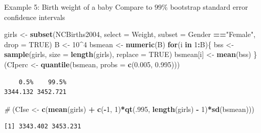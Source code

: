 \documentclass[
  ignorenonframetext,
]{beamer}
\newenvironment{Shaded}{\begin{snugshade}}{\end{snugshade}}
\newcommand{\AttributeTok}[1]{\textcolor[rgb]{0.13,0.29,0.53}{#1}}
\newcommand{\CommentTok}[1]{\textcolor[rgb]{0.56,0.35,0.01}{\textit{#1}}}
\newcommand{\ConstantTok}[1]{\textcolor[rgb]{0.56,0.35,0.01}{#1}}
\newcommand{\ControlFlowTok}[1]{\textcolor[rgb]{0.13,0.29,0.53}{\textbf{#1}}}
\newcommand{\DecValTok}[1]{\textcolor[rgb]{0.00,0.00,0.81}{#1}}
\newcommand{\FloatTok}[1]{\textcolor[rgb]{0.00,0.00,0.81}{#1}}
\newcommand{\FunctionTok}[1]{\textcolor[rgb]{0.13,0.29,0.53}{\textbf{#1}}}
\newcommand{\NormalTok}[1]{#1}
\newcommand{\OtherTok}[1]{\textcolor[rgb]{0.56,0.35,0.01}{#1}}
\newcommand{\SpecialCharTok}[1]{\textcolor[rgb]{0.81,0.36,0.00}{\textbf{#1}}}
\newcommand{\StringTok}[1]{\textcolor[rgb]{0.31,0.60,0.02}{#1}}
\begin{document}
\begin{frame}[fragile]{Example 5: Birth weight of a baby}
\protect\hypertarget{example-5-birth-weight-of-a-baby-6}{}
Compare to \(99\%\) bootstrap standard error confidence intervals \tiny

\begin{Shaded}
\begin{Highlighting}[]
\NormalTok{girls }\OtherTok{\textless{}{-}} \FunctionTok{subset}\NormalTok{(NCBirths2004, }\AttributeTok{select =}\NormalTok{ Weight, }\AttributeTok{subset =}\NormalTok{ Gender }\SpecialCharTok{==}\StringTok{"Female"}\NormalTok{, }\AttributeTok{drop =} \ConstantTok{TRUE}\NormalTok{)}
\NormalTok{B }\OtherTok{\textless{}{-}} \DecValTok{10}\SpecialCharTok{\^{}}\DecValTok{4}
\NormalTok{bsmean }\OtherTok{\textless{}{-}} \FunctionTok{numeric}\NormalTok{(B)}
\ControlFlowTok{for}\NormalTok{(i }\ControlFlowTok{in} \DecValTok{1}\SpecialCharTok{:}\NormalTok{B)\{}
\NormalTok{  bss }\OtherTok{\textless{}{-}} \FunctionTok{sample}\NormalTok{(girls, }\AttributeTok{size =} \FunctionTok{length}\NormalTok{(girls), }\AttributeTok{replace =} \ConstantTok{TRUE}\NormalTok{)}
\NormalTok{  bsmean[i] }\OtherTok{\textless{}{-}} \FunctionTok{mean}\NormalTok{(bss)}
\NormalTok{\}}
\NormalTok{(CIperc }\OtherTok{\textless{}{-}} \FunctionTok{quantile}\NormalTok{(bsmean, }\AttributeTok{probs =} \FunctionTok{c}\NormalTok{(}\FloatTok{0.005}\NormalTok{, }\FloatTok{0.995}\NormalTok{)))}
\end{Highlighting}
\end{Shaded}

\begin{verbatim}
    0.5%    99.5% 
3344.132 3452.721 
\end{verbatim}

\begin{Shaded}
\begin{Highlighting}[]
\CommentTok{\#}
\NormalTok{(CIse }\OtherTok{\textless{}{-}} \FunctionTok{c}\NormalTok{(}\FunctionTok{mean}\NormalTok{(girls) }\SpecialCharTok{+} \FunctionTok{c}\NormalTok{(}\SpecialCharTok{{-}}\DecValTok{1}\NormalTok{, }\DecValTok{1}\NormalTok{)}\SpecialCharTok{*}\FunctionTok{qt}\NormalTok{(.}\DecValTok{995}\NormalTok{, }\FunctionTok{length}\NormalTok{(girls) }\SpecialCharTok{{-}} \DecValTok{1}\NormalTok{)}\SpecialCharTok{*}\FunctionTok{sd}\NormalTok{(bsmean)))}
\end{Highlighting}
\end{Shaded}

\begin{verbatim}
[1] 3343.402 3453.231
\end{verbatim}

\normalsize
\end{frame}
\end{document}
